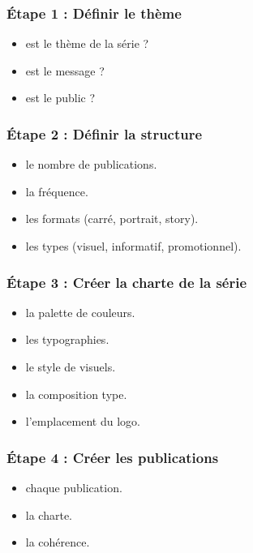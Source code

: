 \subsubsection{Étape 1 : Définir le thème}

\begin{itemize}
    \item {} est le thème de la série ?
    \item {} est le message ?
    \item {} est le public ?
\end{itemize}

\subsubsection{Étape 2 : Définir la structure}

\begin{itemize}
    \item {} le nombre de publications.
    \item {} la fréquence.
    \item {} les formats (carré, portrait, story).
    \item {} les types (visuel, informatif, promotionnel).
\end{itemize}

\subsubsection{Étape 3 : Créer la charte de la série}

\begin{itemize}
    \item {} la palette de couleurs.
    \item {} les typographies.
    \item {} le style de visuels.
    \item {} la composition type.
    \item {} l'emplacement du logo.
\end{itemize}

\subsubsection{Étape 4 : Créer les publications}

\begin{itemize}
    \item {} chaque publication.
    \item {} la charte.
    \item {} la cohérence.
\end{itemize}

